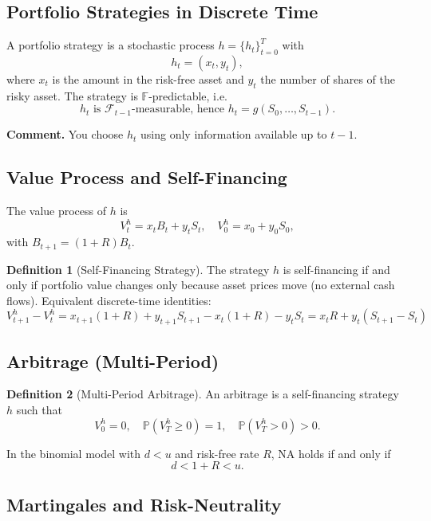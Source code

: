 \documentclass[12pt,a4paper]{article}
\theoremstyle{definition}
\newtheorem{definition}{Definition}[section]
\newcommand{\Prob}{\mathbb{P}}
\begin{document}
\subsection{Portfolio Strategies in Discrete Time}

A portfolio strategy is a stochastic process $h = \{h_t\}_{t=0}^T$ with
\[
h_t = (x_t, y_t),
\]
where $x_t$ is the amount in the risk-free asset and $y_t$ the number of shares of the risky asset. The strategy is $\mathbb{F}$-predictable, i.e.
\[
h_t \text{ is } \mathcal{F}_{t-1}\text{-measurable, hence } h_t = g(S_0, \ldots, S_{t-1}).
\]

\textbf{Comment.} You choose $h_t$ using only information available up to $t-1$.

\subsection{Value Process and Self-Financing}

The value process of $h$ is
\[
V_t^h = x_t B_t + y_t S_t, \quad V_0^h = x_0 + y_0 S_0,
\]
with $B_{t+1} = (1+R)B_t$.

\begin{definition}[Self-Financing Strategy]
The strategy $h$ is self-financing if and only if portfolio value changes only because asset prices move (no external cash flows). Equivalent discrete-time identities:
\begin{equation}
V_{t+1}^h - V_t^h = x_{t+1}(1+R) + y_{t+1}S_{t+1} - x_t(1+R) - y_tS_t = x_tR + y_t(S_{t+1} - S_t)
\end{equation}
\end{definition}

\subsection{Arbitrage (Multi-Period)}

\begin{definition}[Multi-Period Arbitrage]
An arbitrage is a self-financing strategy $h$ such that
\[
V_0^h = 0, \quad \Prob(V_T^h \geq 0) = 1, \quad \Prob(V_T^h > 0) > 0.
\]
\end{definition}

In the binomial model with $d < u$ and risk-free rate $R$, NA holds if and only if
\[
d < 1 + R < u.
\]

\subsection{Martingales and Risk-Neutrality}
\end{document}
